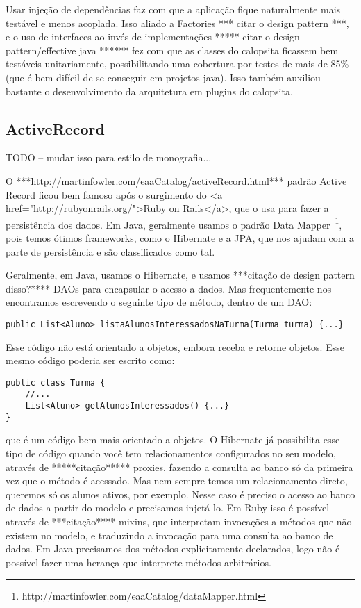 Usar injeção de dependências faz com que a aplicação fique naturalmente mais testável e menos acoplada. Isso aliado a
Factories *** citar o design pattern ***, e o uso de interfaces ao invés de implementações ***** citar o design 
pattern/effective java ****** fez com que as classes do calopsita ficassem bem testáveis unitariamente, possibilitando 
uma cobertura por testes de mais de 85\% (que é bem difícil de se conseguir em projetos java). Isso também auxiliou bastante
o desenvolvimento da arquitetura em plugins do calopsita.

\subsection{ActiveRecord}

TODO -- mudar isso para estilo de monografia...

O ***http://martinfowler.com/eaaCatalog/activeRecord.html*** padrão Active Record ficou bem famoso após o 
surgimento do <a href="http://rubyonrails.org/">Ruby on Rails</a>, que o usa para fazer a persistência dos 
dados. Em Java, geralmente usamos o padrão Data Mapper~\footnote{http://martinfowler.com/eaaCatalog/dataMapper.html}, pois temos ótimos frameworks, como o Hibernate e a JPA, que nos ajudam com a parte de persistência e são classificados como tal.

Geralmente, em Java, usamos o Hibernate, e usamos ***citação de design pattern disso?**** DAOs para encapsular 
o acesso a dados. Mas frequentemente nos encontramos escrevendo o seguinte tipo de método, dentro de um DAO:

\begin{lstlisting}
public List<Aluno> listaAlunosInteressadosNaTurma(Turma turma) {...}
\end{lstlisting}

Esse código não está orientado a objetos, embora receba e retorne objetos. Esse mesmo código poderia ser escrito como:

\begin{lstlisting}
public class Turma {
	//...
	List<Aluno> getAlunosInteressados() {...}
}
\end{lstlisting}

que é um código bem mais orientado a objetos. O Hibernate já possibilita esse tipo de código quando você
tem relacionamentos configurados no seu modelo, através de *****citação***** proxies, fazendo a consulta ao banco
só da primeira vez que o método é acessado. Mas nem sempre temos um relacionamento direto, queremos só os alunos
ativos, por exemplo. Nesse caso é preciso o acesso ao banco de dados a partir do modelo e precisamos injetá-lo.
Em Ruby isso é possível através de ***citação**** mixins, que interpretam invocações a métodos que não existem no
modelo, e traduzindo a invocação para uma consulta ao banco de dados. Em Java precisamos dos métodos explicitamente
declarados, logo não é possível fazer uma herança que interprete métodos arbitrários.

